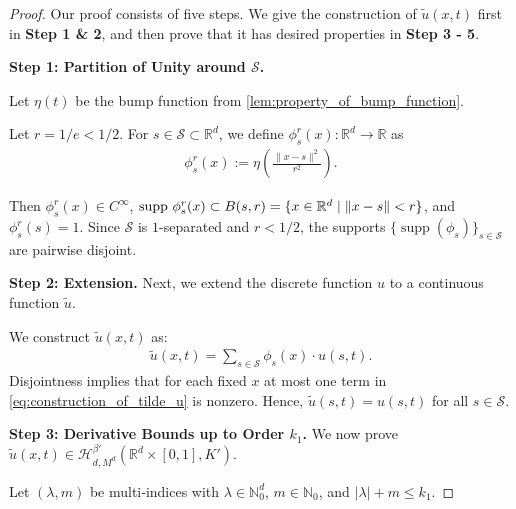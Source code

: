 \documentclass[12pt]{article}
\numberwithin{equation}{section}
\let\tilde\widetilde
\newcommand{\calS}{\mathcal{S}}
\newcommand{\wt}{\widetilde}
\newcommand{\N}{\mathbb{N}}
\renewcommand{\tilde}{\wt}
\DeclareMathOperator{\supp}{supp}
\def\R{\mathbb{R}}
\theoremstyle{theoremstyle}
\numberwithin{equation}{section}
\numberwithin{theorem}{section}
\numberwithin{proposition}{section}
\numberwithin{definition}{section}
\numberwithin{lemma}{section}
\numberwithin{assumption}{section}
\numberwithin{remark}{section}
\begin{document}
\begin{proof}
Our proof consists of five steps.
We give the construction of $\tilde{u}(x,t)$ first in \textbf{Step 1 \& 2}, and then prove that it has desired properties in \textbf{Step 3 - 5}.

\textbf{Step 1: Partition of Unity around $\calS$.}



Let $\eta(t)$ be the bump function from \cref{lem:property_of_bump_function}.

Let $r=1/e<1/2$.
For $s\in\calS\subset \R^d$, we define $\phi^r_s(x):\R^d\to \R$ as
\begin{align*}
\phi^r_s(x) := \eta(\frac{\|x-s\|^2}{r^2}).
\end{align*}

Then $\phi^r_s(x)\in C^\infty$, ${\rm supp}~ \phi^r_s(x) \subset B(s,r)=\{x\in\R^d \mid \|x-s\|<r\}$, and $\phi^r_s(s)=1$.
Since $\calS$ is $1$-separated and $r<1/2$, the supports $\{\supp(\phi_s)\}_{s\in\calS}$ are pairwise disjoint.


\textbf{Step 2: Extension.}
Next, we extend the discrete function $u$ to a continuous function $\tilde{u}$.



We construct $\tilde{u}(x,t)$ as:
\begin{align}
\label{eq:construction_of_tilde_u}
\tilde{u}(x,t)=\sum_{s\in \mathcal{S}} \phi_s(x)\cdot u(s,t). 
\end{align}
Disjointness implies that for each fixed $x$ at most one term in \eqref{eq:construction_of_tilde_u} is nonzero.
Hence, $\tilde u(s,t)=u(s,t)$ for all $s\in\calS$.





\textbf{Step 3: Derivative Bounds up to Order $k_1$.}
We now prove $\tilde{u}(x,t)\in \mathcal{H}^{\beta'}_{d,M^d}(\R^d\times[0,1],K')$.

Let $(\lambda,m)$  be multi‑indices with $\lambda\in\N_0^d$, $m\in\N_0$, and $|\lambda|+m\le k_1$.  


\end{proof}
\end{document}
